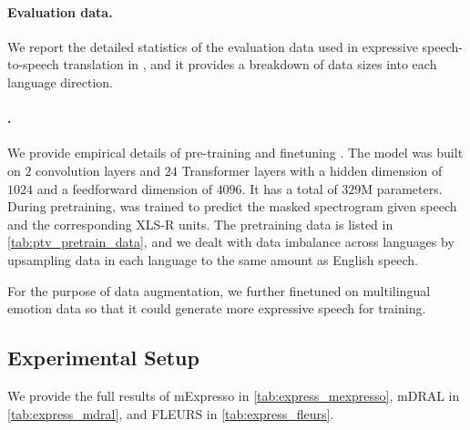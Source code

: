\paragraph{Evaluation data.} We report the detailed statistics of the evaluation data used in expressive speech-to-speech translation in , and it provides a breakdown of data sizes into each language direction.

\paragraph{\unitvb.} We provide empirical details of pre-training and finetuning \unitvb. The model was built on $2$ convolution layers and $24$ Transformer layers with a hidden dimension of $1024$ and a feedforward dimension of $4096$. It has a total of $329$M parameters. During pretraining, \unitvb was trained to predict the masked spectrogram given speech and the corresponding XLS-R units. The pretraining data is listed in \autoref{tab:ptv_pretrain_data}, and we dealt with data imbalance across languages by upsampling data in each language to the same amount as English speech.

For the purpose of data augmentation, we further finetuned \unitvb on multilingual emotion data so that it could generate more expressive speech for \prosodyunitytwo training. 



\subsection{Experimental Setup}

We provide the full results of mExpresso in \autoref{tab:express_mexpresso}, mDRAL in \autoref{tab:express_mdral}, and FLEURS in \autoref{tab:express_fleurs}.



